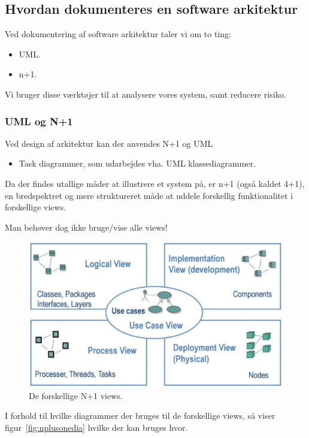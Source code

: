 \subsection{Hvordan dokumenteres en software arkitektur}
Ved dokumentering af software arkitektur taler vi om to ting:
\begin{itemize}
	\item UML.
	\item n+1.
\end{itemize}

Vi bruger disse værktøjer til at analysere vores system, samt reducere risiko.

\subsubsection{UML og N+1}
Ved design af arkitektur kan der anvendes N+1 og UML

\begin{itemize}
	\item Task diagrammer, som udarbejdes vha. UML klassediagrammer.
\end{itemize}

Da der findes utallige måder at illustrere et system på, er n+1 (også kaldet 4+1), en bredspektret og mere struktureret måde at uddele forskellig funktionalitet i forskellige views.

Man behøver dog ikke bruge/vise alle views!

\begin{figure}[H]
	\centering
	\includegraphics[width=0.8\linewidth]{figs/nplusoneview}
	\caption{De forskellige N+1 views.}
	\label{fig:nplusoneview}
\end{figure}

I forhold til hvilke diagrammer der bruges til de forskellige views, så viser figur~\ref{fig:nplusonedia} hvilke der kan bruges hvor.

